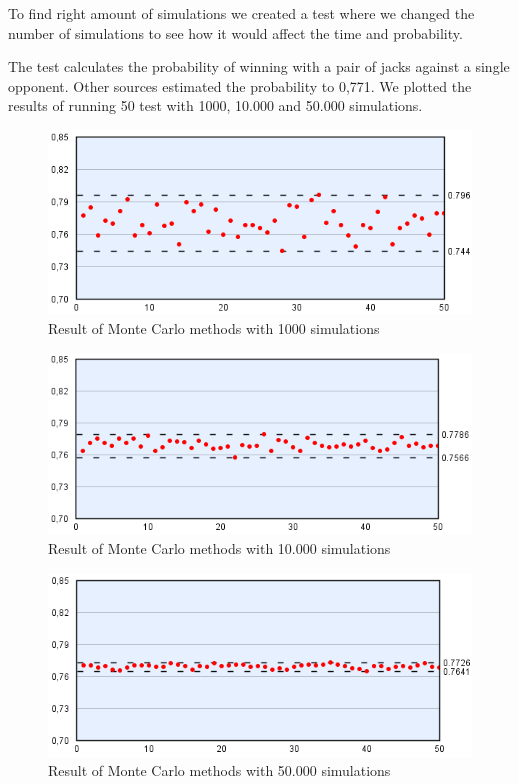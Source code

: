 To find right amount of simulations we created a test where we changed the number of simulations to see how it would affect the time and probability.

The test calculates the probability of winning with a pair of jacks against a single opponent. Other sources estimated the probability to 0,771.
We plotted the results of running 50 test with 1000, 10.000 and 50.000 simulations. 

\begin{figure}[h!]
  \center
    \includegraphics[scale=0.775]{images/MonteCarlo/1k.png}
  \caption{Result of Monte Carlo methods with 1000 simulations}
\end{figure}

\begin{figure}[h!]
  \center
    \includegraphics[scale=0.775]{images/MonteCarlo/10k.png}
  \caption{Result of Monte Carlo methods with 10.000 simulations}
\end{figure}

\begin{figure}[h!]
  \center
    \includegraphics[scale=0.775]{images/MonteCarlo/50k.png}
  \caption{Result of Monte Carlo methods with 50.000 simulations}
\end{figure}

